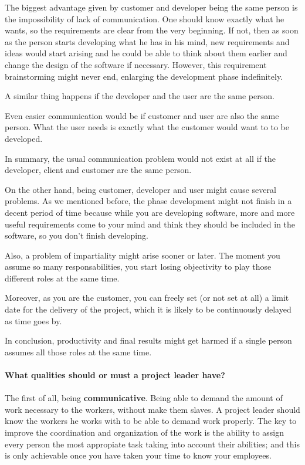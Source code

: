 \documentclass{article}
\begin{document}
The biggest advantage given by customer and developer being the same person is the impossibility of lack of communication. One should know exactly what he wants, so the requirements are clear from the very beginning. If not, then as soon as the person starts developing what he has in his mind, new requirements and ideas would start arising and he could be able to think about them earlier and change the design of the software if necessary. However, this requirement brainstorming might never end, enlarging the development phase indefinitely.

A similar thing happens if the developer and the user are the same person. 

Even easier communication would be if customer and user are also the same person. What the user needs is exactly what the customer would want to to be developed.

In summary, the usual communication problem would not exist at all if the developer, client and customer are the same person.



On the other hand, being customer, developer and user might cause several problems. As we mentioned before, the phase development might not finish in a decent period of time because while you are developing software, more and more useful requirements come to your mind and think they should be included in the software, so you don't finish developing.

Also, a problem of impartiality might arise sooner or later. The moment you assume so many responsabilities, you start losing objectivity to play those different roles at the same time.

Moreover, as you are the customer, you can freely set (or not set at all) a limit date for the delivery of the project, which it is likely to be continuously delayed as time goes by.

In conclusion, productivity and final results might get harmed if a single person assumes all those roles at the same time.



\paragraph{What qualities should or must a project leader have?}
\paragraph{}
The first of all, being \textbf{communicative}. Being able to demand the amount of work necessary to the workers, without make them slaves. A project leader should know the workers he works with to be able to demand work properly. The key to improve the coordination and organization of the work is the ability to assign every person the most appropiate task taking into account their abilities; and this is only achievable once you have taken your time to know your employees.
\end{document}
